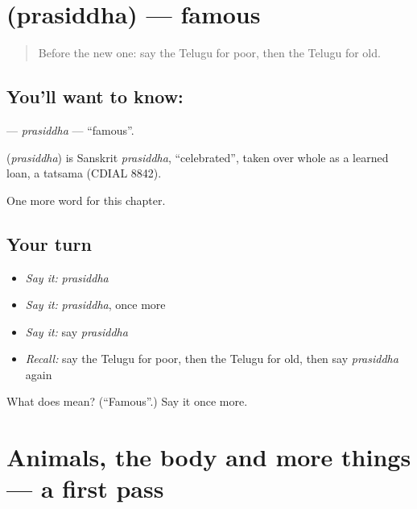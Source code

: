 \section[\texorpdfstring{\te{ప్రసిద్ధ} (prasiddha)}{ప్రసిద్ధ (prasiddha)}]{ (prasiddha) — famous}

\label{lesson:TE-C139-prasiddha}



\begin{quote}
Before the new one: say the Telugu for poor, then the Telugu for old.
\end{quote}

\subsection*{You'll want to know: }
\textbf{} — \emph{prasiddha} — \textquotedblleft{}famous\textquotedblright{}.

\begin{cousinweb}
\textbf{} (\emph{prasiddha}) is Sanskrit \emph{prasiddha}, \textquotedblleft{}celebrated\textquotedblright{}, taken over whole as a learned loan, a tatsama (CDIAL 8842).
\end{cousinweb}

\begin{grammarlens}[title={What you've built}]
One more word for this chapter.
\end{grammarlens}

\subsection*{Your turn}
\begin{itemize}
\raggedright
  \item \emph{Say it:} \emph{prasiddha}
  \item \emph{Say it:} \emph{prasiddha}, once more
  \item \emph{Say it:} say \emph{prasiddha}
  \item \emph{Recall:} say the Telugu for poor, then the Telugu for old, then say \emph{prasiddha} again
\end{itemize}

\begin{tcolorbox}[breakable,colback=teal!4,colframe=teal!35!black,title={Before you move on}]
What does  mean? (\textquotedblleft{}Famous\textquotedblright{}.) Say it once more.
\end{tcolorbox}
\section[(dialogue)]{Animals, the body and more things — a first pass}

